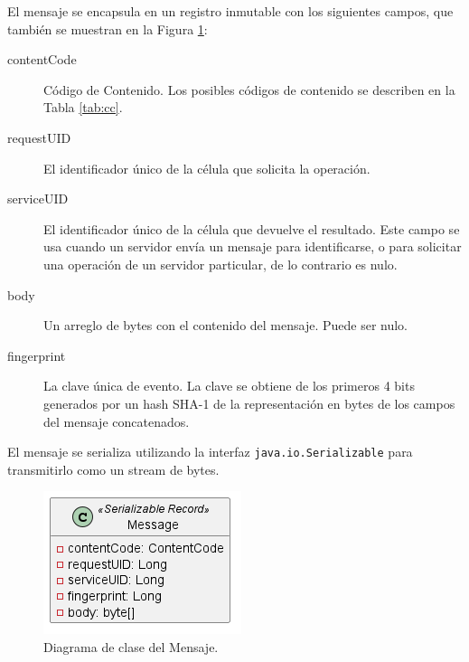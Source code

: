 \documentclass[conference,compsoc]{IEEEtran}
\begin{document}
El mensaje se encapsula en un registro inmutable con los siguientes campos, que también se muestran en la Figura \ref{fig:message}:
\begin{description}
    \item[contentCode] Código de Contenido. Los posibles códigos de contenido se describen en la Tabla \ref{tab:cc}.
    \item[requestUID] El identificador único de la célula que solicita la operación.
    \item[serviceUID] El identificador único de la célula que devuelve el resultado. Este campo se usa cuando un servidor envía un mensaje para identificarse, o para solicitar una operación de un servidor particular, de lo contrario es nulo.
    \item[body] Un arreglo de bytes con el contenido del mensaje. Puede ser nulo.
    \item[fingerprint] La clave única de evento. La clave se obtiene de los primeros 4 bits generados por un hash SHA-1 de la representación en bytes de los campos del mensaje concatenados.
\end{description}

El mensaje se serializa utilizando la interfaz \texttt{java.io.Serializable} para transmitirlo como un stream de bytes.

\begin{figure}[hbt]
    \centering
    \includegraphics[width=0.5\columnwidth]{message.png}
    \caption{Diagrama de clase del Mensaje.}
    \label{fig:message}
\end{figure}
\end{document}
